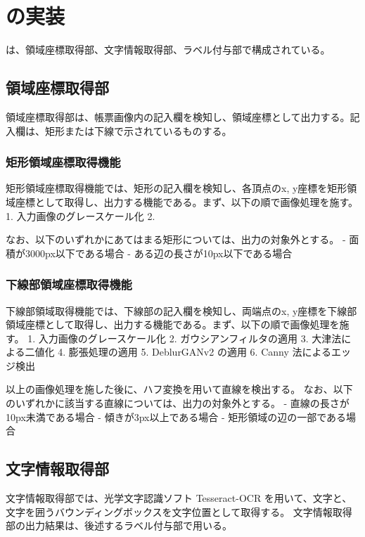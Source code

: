 \chapter{\toolName の実装}\label{cha:Implementation}
\toolName は、領域座標取得部、文字情報取得部、ラベル付与部で構成されている。


\section{領域座標取得部}\label{sec:area_coords_obtainment_part}
領域座標取得部は、帳票画像内の記入欄を検知し、領域座標として出力する。記入欄は、矩形または下線で示されているものする。


\subsection{矩形領域座標取得機能}\label{subsec:rect_coords_obtainment}
矩形領域座標取得機能では、矩形の記入欄を検知し、各頂点のx, y座標を矩形領域座標として取得し、出力する機能である。まず、以下の順で画像処理を施す。
1. 入力画像のグレースケール化
2. 

なお、以下のいずれかにあてはまる矩形については、出力の対象外とする。
- 面積が3000px以下である場合
- ある辺の長さが10px以下である場合


\subsection{下線部領域座標取得機能}\label{subsec:underline_coords_obtainment}
下線部領域取得機能では、下線部の記入欄を検知し、両端点のx, y座標を下線部領域座標として取得し、出力する機能である。まず、以下の順で画像処理を施す。
1. 入力画像のグレースケール化
2. ガウシアンフィルタの適用
3. 大津法による二値化
4. 膨張処理の適用
5. DeblurGANv2 の適用
6. Canny 法によるエッジ検出

以上の画像処理を施した後に、ハフ変換を用いて直線を検出する。
なお、以下のいずれかに該当する直線については、出力の対象外とする。
- 直線の長さが10px未満である場合
- 傾きが3px以上である場合
- 矩形領域の辺の一部である場合


\section{文字情報取得部}\label{sec:OCR_part}
文字情報取得部では、光学文字認識ソフト Tesseract-OCR を用いて、文字と、文字を囲うバウンディングボックスを文字位置として取得する。
文字情報取得部の出力結果は、後述するラベル付与部で用いる。

